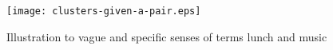 \begin{figure}[th]
 \centerline{
 \texttt{[image: clusters-given-a-pair.eps]}}
\caption{Illustration to vague and specific senses of terms lunch and music} \label{fig:clusters-given-a-pair}
\end{figure}



